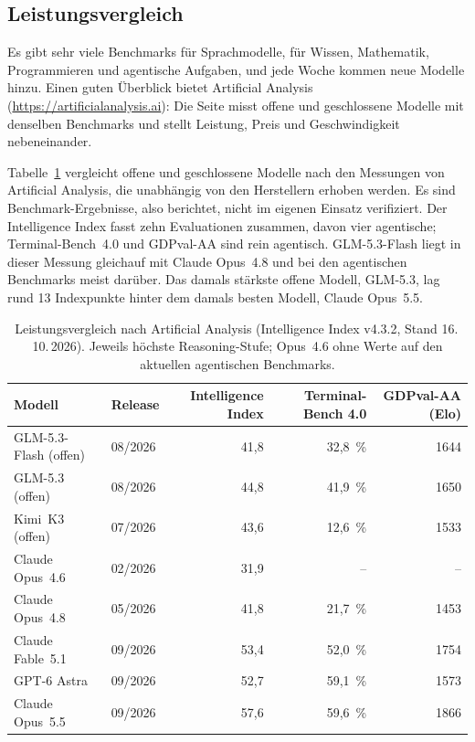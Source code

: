 \documentclass[a4paper,11pt]{article}
\begin{document}
\subsection{Leistungsvergleich}
\label{sec:vergleich}

Es gibt sehr viele Benchmarks für Sprachmodelle, für Wissen,
Mathematik, Programmieren und agentische Aufgaben, und jede Woche
kommen neue Modelle hinzu. Einen guten Überblick bietet Artificial
Analysis (\url{https://artificialanalysis.ai}): Die Seite misst
offene und geschlossene Modelle mit denselben Benchmarks und stellt
Leistung, Preis und Geschwindigkeit nebeneinander.

Tabelle~\ref{tab:vergleich} vergleicht offene und geschlossene Modelle
nach den Messungen von Artificial Analysis, die unabhängig von den
Herstellern erhoben werden. Es sind Benchmark-Ergebnisse, also
berichtet, nicht im eigenen Einsatz verifiziert. Der Intelligence
Index fasst zehn Evaluationen zusammen, davon vier agentische;
Terminal-Bench~4.0 und GDPval-AA sind rein agentisch. GLM-5.3-Flash
liegt in dieser Messung gleichauf mit Claude Opus~4.8 und bei den
agentischen Benchmarks meist darüber. Das damals stärkste offene
Modell, GLM-5.3, lag rund 13 Indexpunkte hinter dem damals besten
Modell, Claude Opus~5.5.

\begin{table}[htbp]
  \centering
  \footnotesize
  \begin{tabular}{llrrr}
    \toprule
    Modell & Release & Intelligence Index & Terminal-Bench 4.0 & GDPval-AA (Elo) \\
    \midrule
    GLM-5.3-Flash (offen) & 08/2026 & 41,8 & 32,8~\% & \num{1644} \\
    GLM-5.3 (offen) & 08/2026 & 44,8 & 41,9~\% & \num{1650} \\
    Kimi~K3 (offen) & 07/2026 & 43,6 & 12,6~\% & \num{1533} \\
    Claude Opus~4.6 & 02/2026 & 31,9 & -- & -- \\
    Claude Opus~4.8 & 05/2026 & 41,8 & 21,7~\% & \num{1453} \\
    Claude Fable~5.1 & 09/2026 & 53,4 & 52,0~\% & \num{1754} \\
    GPT-6 Astra & 09/2026 & 52,7 & 59,1~\% & \num{1573} \\
    Claude Opus~5.5 & 09/2026 & 57,6 & 59,6~\% & \num{1866} \\
    \bottomrule
  \end{tabular}
  \caption{Leistungsvergleich nach Artificial Analysis (Intelligence
    Index v4.3.2, Stand 16.\,10.\,2026). Jeweils höchste
    Reasoning-Stufe; Opus~4.6 ohne Werte auf den aktuellen agentischen
    Benchmarks.}
  \label{tab:vergleich}
\end{table}
\end{document}
